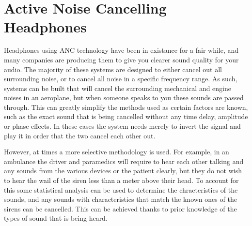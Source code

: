 \section{Active Noise Cancelling Headphones}
Headphones using ANC technology have been in existance for a fair while, and many companies are producing them to give you clearer sound quality for your audio.
The majority of these systems are designed to either cancel out all surrounding noise, or to cancel all noise in a specific frequency range.
As such, systems can be built that will cancel the surrounding mechanical and engine noises in an aeroplane, but when someone speaks to you these sounds are passed through.
This can greatly simplify the methods used as certain factors are known, such as the exact sound that is being cancelled without any time delay, amplitude or phase effects.
In these cases the system needs merely to invert the signal and play it in order that the two cancel each other out\cite{EMNoiseCancel}.

However, at times a more selective methodology is used. For example, in an ambulance the driver and paramedics will require to hear each other talking and any sounds from the various devices or the patient clearly, but they do not wish to hear the wail of the siren less than a meter above their head\cite{EMHeadsets}.
To account for this some statistical analysis can be used to determine the chracteristics of the sounds, and any sounds with characteristics that match the known ones of the sirens can be cancelled.
This can be achieved thanks to prior knowledge of the types of sound that is being heard.
